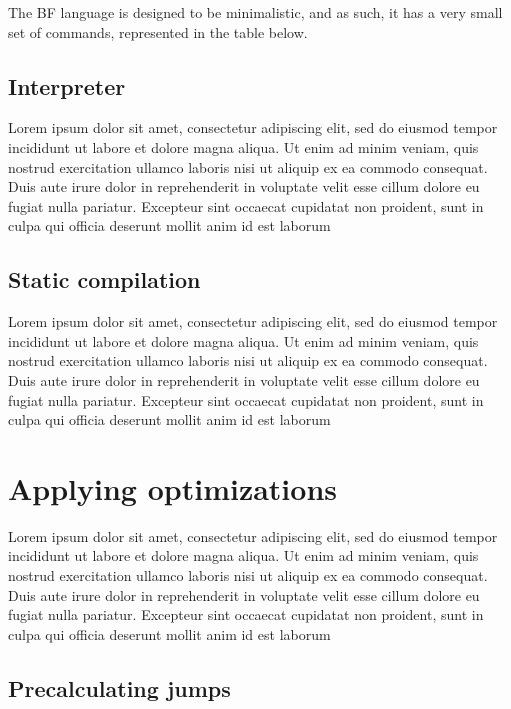 \par The BF language is designed to be minimalistic, and as such, it has a very small set of commands, represented in the table below.

\subsection{Interpreter}
\label{sec:ch2sec2sub1}

\par Lorem ipsum dolor sit amet, consectetur adipiscing elit, sed do eiusmod tempor incididunt ut labore et dolore magna aliqua. Ut enim ad minim veniam, quis nostrud exercitation ullamco laboris nisi ut aliquip ex ea commodo consequat. Duis aute irure dolor in reprehenderit in voluptate velit esse cillum dolore eu fugiat nulla pariatur. Excepteur sint occaecat cupidatat non proident, sunt in culpa qui officia deserunt mollit anim id est laborum

\subsection{Static compilation}
\label{sec:ch2sec2sub2}

\par Lorem ipsum dolor sit amet, consectetur adipiscing elit, sed do eiusmod tempor incididunt ut labore et dolore magna aliqua. Ut enim ad minim veniam, quis nostrud exercitation ullamco laboris nisi ut aliquip ex ea commodo consequat. Duis aute irure dolor in reprehenderit in voluptate velit esse cillum dolore eu fugiat nulla pariatur. Excepteur sint occaecat cupidatat non proident, sunt in culpa qui officia deserunt mollit anim id est laborum

\section{Applying optimizations}
\label{sec:ch2sec3}

\par Lorem ipsum dolor sit amet, consectetur adipiscing elit, sed do eiusmod tempor incididunt ut labore et dolore magna aliqua. Ut enim ad minim veniam, quis nostrud exercitation ullamco laboris nisi ut aliquip ex ea commodo consequat. Duis aute irure dolor in reprehenderit in voluptate velit esse cillum dolore eu fugiat nulla pariatur. Excepteur sint occaecat cupidatat non proident, sunt in culpa qui officia deserunt mollit anim id est laborum

\subsection{Precalculating jumps}
\label{subsec:ch2sec3sec1}

